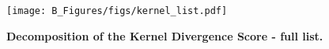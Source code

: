 
\begin{figure}[h]
    \begin{center}
    \vspace{10mm}
    \texttt{[image: B\_Figures/figs/kernel\_list.pdf]}
    \end{center}
    \caption{\textbf{Decomposition of the Kernel Divergence Score - full list.}}
\label{fig:k_decomp_full}
\end{figure}
